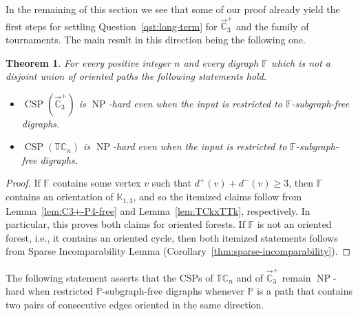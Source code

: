 \documentclass{article}
\newtheorem{theorem}{Theorem}
\theoremstyle{definition}
\theoremstyle{remark}
\DeclareMathOperator{\NP}{NP}
\DeclareMathOperator{\CSP}{CSP}
\newcommand{\bC}{{\mathbb C}}
\newcommand{\bF}{{\mathbb F}}
\newcommand{\bK}{{\mathbb K}}
\newcommand{\bP}{{\mathbb P}}
\newcommand{\bT}{{\mathbb T}}
\begin{document}
In the remaining of this section we see that some of our proof already yield the first steps 
for settling Question~\ref{qst:long-term} for $\vec{\bC}_3^+$ and the family of tournaments.
The main result in this direction being the following one. 

\begin{theorem}\label{thm:non-paths}
    For every positive integer $n$ and every digraph $\bF$ which is not a disjoint union of oriented paths
    the following statements hold.
    \begin{itemize}
        \item $\CSP(\vec{\bC}_3^+)$ is $\NP$-hard even when the input is restricted to $\bF$-subgraph-free digraphs.
        \item $\CSP(\bT\bC_n)$ is $\NP$-hard even when the input is restricted to $\bF$-subgraph-free digraphs.
    \end{itemize}
\end{theorem}
\begin{proof}
    If $\bF$ contains some vertex $v$ such that $d^+(v) + d^-(v) \ge 3$, then $\bF$ contains an orientation
    of $\bK_{1,3}$, and so the itemized claims follow from Lemma~\ref{lem:C3+-P4-free} and
    Lemma~\ref{lem:TCkxTTk}, respectively. In particular, this proves both claims for oriented forests. 
    If $\bF$ is not an oriented forest, i.e., it contains an oriented cycle, then both itemized statements
    follows from Sparse Incomparability Lemma (Corollary~\ref{thm:sparse-incomparability}).
\end{proof}


The following statement asserts that the CSPs of $\bT\bC_n$ and of $\vec{\bC}_3^+$ remain
$\NP$-hard when restricted $\bP$-subgraph-free digraphs whenever $\bP$ 
is a path that contains two pairs of consecutive edges oriented in the same direction.
\end{document}

